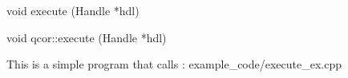 \apisummary{
    
}

\begin{apidefinition}

\begin{Csynopsis}
    void execute (Handle *hdl)
\end{Csynopsis}

\begin{Cppsynopsis}
    void qcor::execute (Handle *hdl)
\end{Cppsynopsis}


\begin{apiarguments}
\end{apiarguments}


\apireturnvalues{
    
}      

\apinotes{
    
}

\begin{apiexamples}

\apicppexample
    { This is a simple program that calls : } 
    { example_code/execute_ex.cpp} 
    {}

\end{apiexamples}

\end{apidefinition}
